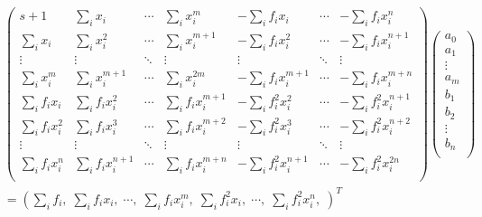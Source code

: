 \documentclass[a4paper]{article}
\begin{document}
\begin{align*}
	& \begin{pmatrix} 
		s+1 &
		\sum_{i} x_i &
		\cdots &
		\sum_{i} x_i ^{m} &
		- \sum_{i} f_i x_i &
		\cdots &
		- \sum_{i} f_i x_i ^{n} \\[1em]
		\sum_{i} x_i &
		\sum_{i} x_i ^2 &
		\cdots &
		\sum_{i} x_i ^{m+1} &
		- \sum_{i} f_i x_i ^2 &
		\cdots &
		- \sum_{i} f_i x_i ^{n+1} \\[1em]
		\vdots &
		\vdots &
		\ddots &
		\vdots &
		\vdots &
		\ddots &
		\vdots \\[1em]
		\sum_{i} x_i ^{m} &
		\sum_{i} x_i ^{m+1} &
		\cdots &
		\sum_{i} x_i ^{2m} &
		- \sum_{i} f_i x_i ^{m+1} &
		\cdots &
		- \sum_{i} f_i x_i ^{m+n} \\[1em]
		\sum_{i} f_i x_i &
		\sum_{i} f_i x_i ^2 &
		\cdots &
		\sum_{i} f_i x_i ^{m+1} &
		- \sum_{i} f_i ^2 x_i ^2 &
		\cdots &
		- \sum_{i} f_i ^2 x_i ^{n+1} \\[1em]
		\sum_{i} f_i x_i ^2 &
		\sum_{i} f_i x_i ^3 &
		\cdots &
		\sum_{i} f_i x_i ^{m+2} &
		- \sum_{i} f_i ^2 x_i ^3 &
		\cdots &
		- \sum_{i} f_i ^2 x_i ^{n+2} \\[1em]
		\vdots &
		\vdots &
		\ddots &
		\vdots &
		\vdots &
		\ddots &
		\vdots \\[1em]
		\sum_{i} f_i x_i ^n &
		\sum_{i} f_i x_i ^{n+1} &
		\cdots &
		\sum_{i} f_i x_i ^{m+n} &
		- \sum_{i} f_i ^2 x_i ^{n+1} &
		\cdots &
		- \sum_{i} f_i ^2 x_i ^{2n} \\[1em]
	\end{pmatrix} 
	\begin{pmatrix} 
		a_0 \\[1em]
		a_1 \\[1em]
		\vdots \\[1em]
		a_m \\[1em]
		b_1 \\[1em]
		b_2 \\[1em]
		\vdots \\[1em]
		b_n \\[1em]
	\end{pmatrix} \\
	&= \left(
		\sum_i f_i, \;
		\sum_i f_i x_{i}, \;
		\cdots, \;
		\sum_i f_i x_{i} ^{m}, \;
		\sum_i f_i ^2 x_{i}, \;
		\cdots, \;
		\sum_i f_i ^2 x_{i} ^{n}, \;
	\right) ^{T}
\end{align*}
\end{document}
